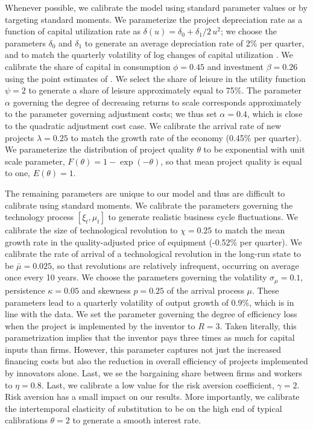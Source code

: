 \documentclass[12pt]{article}
\renewcommand{\cite}{\citet}
\begin{document}
Whenever possible, we calibrate the model using standard parameter values or by targeting standard moments. We parameterize the project depreciation rate as a function of capital utilization rate as $\delta(u) = \delta_0 + {\delta_1}/{2}\, u^2$; we choose the parameters $\delta_0$ and $\delta_1$ to generate an average depreciation rate of 2\% per quarter, and to match the  quarterly volatility of log changes of capital utilization \citep[equal to 0.75\%  using the data from][]{Basu2006}. We calibrate the share of capital in consumption $\phi=0.45$ and investment $\beta=0.26$ using the point estimates of \cite{CV2002}. We select the share of leisure in the utility function $\psi=2$ to generate a share of leisure approximately equal to 75\%. The parameter $\alpha$ governing the degree of decreasing returns to scale corresponds approximately to the parameter governing adjustment costs; we thus set $\alpha=0.4$, which is close to the quadratic adjustment cost case. We calibrate the arrival rate of new projects $\lambda=0.25$ to match the growth rate of the economy (0.45\% per quarter). We parameterize the distribution of project quality $\theta$ to be exponential with unit scale parameter, $F(\theta)  = 1 - \exp(-\theta)$, so that mean project quality is equal to one, $E(\theta)=1$.


The remaining parameters are unique to our model and thus are difficult to calibrate using standard moments.  We calibrate the parameters governing the technology process $[\xi_t, \mu_t]$ to  generate realistic business cycle fluctuations. We calibrate the  size of technological revolution to $\chi=0.25$ to match the mean growth rate in the quality-adjusted price of equipment (-0.52\% per quarter).  We calibrate the rate of arrival of a technological revolution in the long-run state to be $\bar\mu=0.025$, so that revolutions are relatively infrequent, occurring on average once every 10 years. We choose the parameters governing the volatility $\sigma_\mu=0.1$, persistence $\kappa=0.05$ and skewness $p=0.25$ of the arrival process $\mu$. These parameters lead to a quarterly volatility of output growth of 0.9\%, which is in line with the data.  We set the parameter governing the degree of efficiency loss when the project is implemented by the inventor to $R=3$. Taken literally, this parametrization implies that the inventor pays three times as much for capital inputs than firms. However, this parameter captures not just the increased financing costs but also the reduction in overall efficiency of projects implemented by innovators alone. Last, we se the bargaining share between firms and workers  to $\eta=0.8$. Last, we calibrate a low value for the  risk aversion coefficient, $\gamma=2$. Risk aversion has a small impact on our results. More importantly, we calibrate the intertemporal elasticity of substitution to be on the high end of typical calibrations $\theta=2$ to generate a smooth interest rate.
\end{document}
